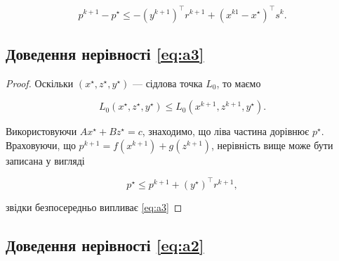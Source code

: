 \begin{equation*}
    p^{k + 1} - p^\star \le - \left( y^{k + 1} \right)^\intercal r^{k + 1} + \left( x^{k  1} - x^\star \right)^\intercal s^k.
\end{equation*}

\subsection*{Доведення нерівності \eqref{eq:a3}}

\begin{proof}
    Оскільки $\left( x^\star, z^\star, y^\star \right)$ --- сідлова точка $L_0$, то маємо

    \begin{equation*}
        L_0 \left( x^\star, z^\star, y^\star \right) \le L_0 \left( x^{k + 1}, z^{k + 1}, y^\star \right).
    \end{equation*}

    Використовуючи $A x^\star + B z^\star = c$, знаходимо, що ліва частина дорівнює $p^\star$. Враховуючи, що $p^{k + 1} = f\left(x^{k + 1}\right) + g\left(z^{k + 1}\right)$, нерівність вище може бути записана у вигляді

    \begin{equation*}
        p^\star \le p^{k + 1} + \left( y^\star \right)^\intercal r^{k + 1},
    \end{equation*}

    звідки безпосередньо випливає \eqref{eq:a3}
\end{proof}

\subsection*{Доведення нерівності \eqref{eq:a2}}

